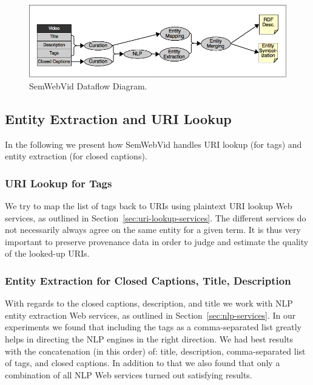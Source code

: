\documentclass[12pt]{article}
\begin{document}
\begin{figure}[htbp!]
\begin{center}
  \includegraphics[width=\linewidth]{./resources/semwebvid-dataflow.png}
    \caption{SemWebVid Dataflow Diagram.}
  \label{fig:dataflow}
  \end{center}  
\end{figure}

\subsection{Entity Extraction and URI Lookup}
In the following we present how SemWebVid handles URI lookup (for tags) and entity extraction (for closed captions).

\subsubsection{URI Lookup for Tags}
We try to map the list of tags back to URIs using plaintext URI lookup Web services, as outlined in Section~\ref{sec:uri-lookup-services}. The different services do not necessarily always agree on the same entity for a given term. It is thus very important to preserve provenance data in order to judge and estimate the quality of the looked-up URIs.

\subsubsection{Entity Extraction for Closed Captions, Title, Description}
With regards to the closed captions, description, and title we work with NLP entity extraction Web services, as outlined in Section~\ref{sec:nlp-services}. In our experiments we found that including the tags as a comma-separated list greatly helps in directing the NLP engines in the right direction. We had best results with the concatenation (in this order) of: title, description, comma-separated list of tags, and closed captions. In addition to that we also found that only a combination of all NLP Web services turned out satisfying results.
\end{document}
